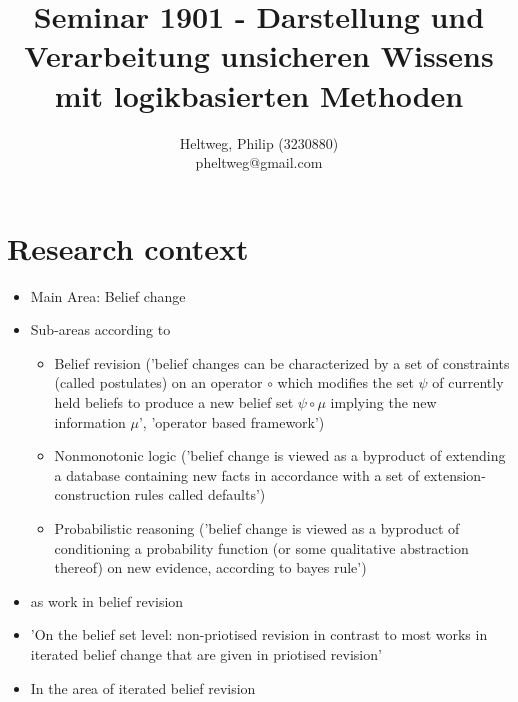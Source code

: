 \documentclass[11pt]{article}
\begin{document}
\title{Seminar 1901 - Darstellung und Verarbeitung unsicheren Wissens mit logikbasierten Methoden}
\author{
	Heltweg, Philip (3230880) \\
	pheltweg@gmail.com
}
\maketitle

\newpage

\tableofcontents

\newpage

\section{Research context}
\begin{itemize}
    \item Main Area: Belief change
    \item Sub-areas according to \cite{Darwiche1997}
    \begin{itemize}
        \item Belief revision ('belief changes can be characterized by a set of constraints (called postulates) on an operator $\circ$ which modifies the set $\psi$ of currently held beliefs to produce a new belief set $\psi \circ \mu$ implying the new information $\mu$', 'operator based framework')
        \item Nonmonotonic logic ('belief change is viewed as a byproduct of extending a database containing new facts in accordance with a set of extension-construction rules called defaults') 
        \item Probabilistic reasoning ('belief change is viewed as a byproduct of conditioning a probability function (or some qualitative abstraction thereof) on new evidence, according to bayes rule')
    \end{itemize}
    \item \cite{Booth2006} as work in belief revision
    \item 'On the belief set level: \gls{non-priotised revision} in contrast to most works in iterated belief change that are given in priotised revision' \cite{Booth2006}
    \item In the area of \gls{iterated belief revision} \cite{Booth2006}
\end{itemize}
\end{document}
